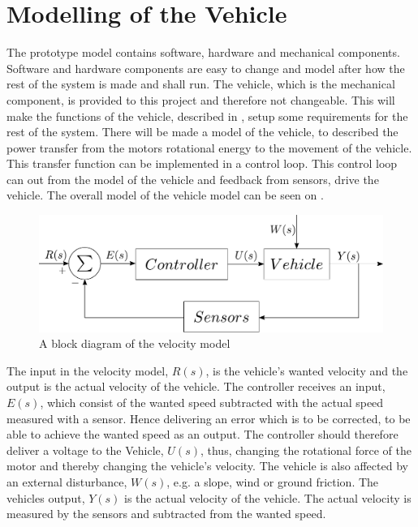 \chapter{Modelling of the Vehicle}\label{cha:ModelOfVehicle}

The prototype model contains software, hardware and mechanical components. Software and hardware components are easy to change and model after how the rest of the system is made and shall run. The vehicle, which is the mechanical component, is provided to this project and therefore not changeable. This will make the functions of the vehicle, described in , setup some requirements for the rest of the system. There will be made a model of the vehicle, to described the power transfer from the motors rotational energy to the movement of the vehicle. This transfer function can be implemented in a control loop. This control loop can out from the model of the vehicle and feedback from sensors, drive the vehicle. The overall model of the vehicle model can be seen on .


\begin{figure}[H]
	\centering
	\includegraphics[scale=0.6]{figures/StartTotalModelsystem.pdf}
	\caption{A block diagram of the velocity model}
	\label{fig:StartTotalModelsystem}
\end{figure}

The input in the velocity model, $R(s)$, is the vehicle's wanted velocity and the output is the actual velocity of the vehicle. The controller receives an input, $E(s)$, which consist of the wanted speed subtracted with the actual speed measured with a sensor. Hence delivering an error which is to be corrected, to be able to achieve the wanted speed as an output. The controller should therefore deliver a voltage to the Vehicle, $U(s)$, thus, changing the rotational force of the motor and thereby changing the vehicle's velocity. The vehicle is also affected by an external disturbance, $W(s)$, e.g. a slope, wind or ground friction. The vehicles output, $Y(s)$ is the actual velocity of the vehicle. The actual velocity is measured by the sensors and subtracted from the wanted speed.

